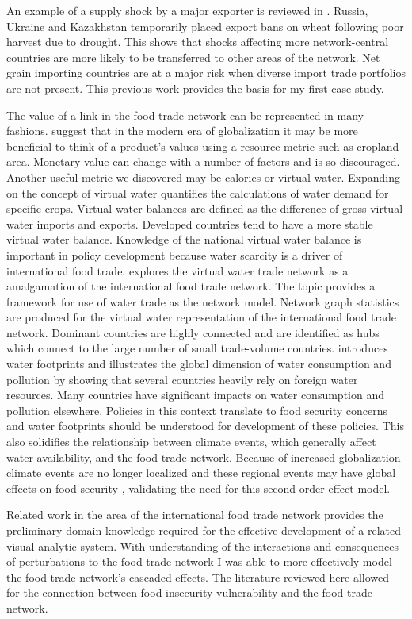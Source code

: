 An example of a supply shock by a major exporter is reviewed in \cite{fellmann2014harvest}. Russia, Ukraine and Kazakhstan temporarily placed export bans on wheat following poor harvest due to drought. This shows that shocks affecting more network-central countries are more likely to be transferred to other areas of the network. Net grain importing countries are at a major risk when diverse import trade portfolios are not present. This previous work provides the basis for my first case study.\par
The value of a link in the food trade network can be represented in many fashions. \cite{macdonald2015rethinking} suggest that in the modern era of globalization it may be more beneficial to think of a product's values using a resource metric such as cropland area. Monetary value can change with a number of factors and is so discouraged. Another useful metric we discovered may be calories or virtual water. Expanding on the concept of virtual water \cite{hoekstra2005globalisation} quantifies the calculations of water demand for specific crops. Virtual water balances are defined as the difference of gross virtual water imports and exports. Developed countries tend to have a more stable virtual water balance. Knowledge of the national virtual water balance is important in policy development because water scarcity is a driver of international food trade. \cite{konar2011water} explores the virtual water trade network as a amalgamation of the international food trade network. The topic provides a framework for use of water trade as the network model. Network graph statistics are produced for the virtual water representation of the international food trade network. Dominant countries are highly connected and are identified as hubs which connect to the large number of small trade-volume countries. \cite{hoekstra2012water} introduces water footprints and illustrates the global dimension of water consumption and pollution by showing that several countries heavily rely on foreign water resources. Many countries have significant impacts on water consumption and pollution elsewhere. Policies in this context translate to food security concerns and water footprints should be understood for development of these policies. This also solidifies the relationship between climate events, which generally affect water availability, and the food trade network. Because of increased globalization climate events are no longer localized and these regional events may have global effects on food security \citep{sternberg2012chinese}, validating the need for this second-order effect model.\par
Related work in the area of the international food trade network provides the preliminary domain-knowledge required for the effective development of a related visual analytic system. With understanding of the interactions and consequences of perturbations to the food trade network I was able to more effectively model the food trade network's cascaded effects. The literature reviewed here allowed for the connection between food insecurity vulnerability and the food trade network.\par







